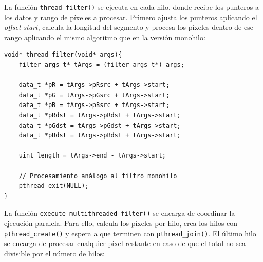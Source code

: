 \documentclass[11pt,a4paper]{article}
\begin{document}
\noindent La función \texttt{thread\_filter()} se ejecuta en cada hilo, donde recibe los punteros a los datos y rango de píxeles a procesar. Primero ajusta los punteros aplicando el \textit{offset start}, calcula la longitud del segmento y procesa los píxeles dentro de ese rango aplicando el mismo algoritmo que en la versión monohilo:
\begin{lstlisting}[style=cppStyle]
void* thread_filter(void* args){
    filter_args_t* tArgs = (filter_args_t*) args;
    
    data_t *pR = tArgs->pRsrc + tArgs->start;
    data_t *pG = tArgs->pGsrc + tArgs->start;
    data_t *pB = tArgs->pBsrc + tArgs->start;
    data_t *pRdst = tArgs->pRdst + tArgs->start;
    data_t *pGdst = tArgs->pGdst + tArgs->start;
    data_t *pBdst = tArgs->pBdst + tArgs->start;
    
    uint length = tArgs->end - tArgs->start;
    
    // Procesamiento análogo al filtro monohilo
    pthread_exit(NULL);
}
\end{lstlisting}
\noindent La función \texttt{execute\_multithreaded\_filter()} se encarga de coordinar la ejecución paralela. Para ello, calcula los píxeles por hilo, crea los hilos con \texttt{pthread\_create()} y espera a que terminen con \texttt{pthread\_join()}. El último hilo se encarga de procesar cualquier píxel restante en caso de que el total no sea divisible por el número de hilos:
\vspace{1ex}
\end{document}
